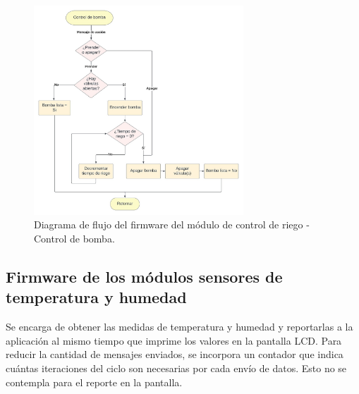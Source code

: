 \begin{figure}[!h]
	\centering
	\includegraphics[width=0.7\textwidth]{./Figures/chapter3/FirmwarePumpControl.jpg}
	\caption[Diagrama de flujo del firmware del módulo de control de riego - Control de bomba]{Diagrama de flujo del firmware del módulo de control de riego - Control de bomba.}
	\label{fig:flow_bombacontrol}
\end{figure}







\pagebreak
\subsection{Firmware de los módulos sensores de temperatura y humedad}
\label{Firmware de los módulos sensores de de temperatura y humedad}

Se encarga de obtener las medidas de temperatura y humedad y reportarlas a la aplicación al mismo tiempo que imprime los valores en la pantalla LCD. Para reducir la cantidad de mensajes enviados, se incorpora un contador que indica cuántas iteraciones del ciclo son necesarias por cada envío de datos. Esto no se contempla para el reporte en la pantalla.


